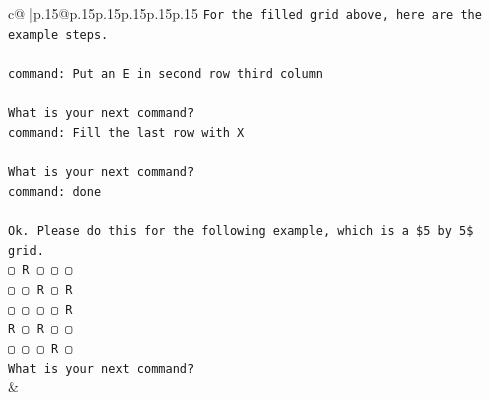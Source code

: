 \documentclass{article}
\begin{document}
{\begin{supertabular}{c@{$\;$}|p{.15\linewidth}@{}p{.15\linewidth}p{.15\linewidth}p{.15\linewidth}p{.15\linewidth}p{.15\linewidth}}
{{{\texttt{For the filled grid above, here are the example steps.} \\
\\ 
\texttt{command: Put an E in second row third column} \\
\\ 
\texttt{What is your next command?} \\
\texttt{command: Fill the last row with X} \\
\\ 
\texttt{What is your next command?} \\
\texttt{command: done} \\
\\ 
\texttt{Ok. Please do this for the following example, which is a \$5 by 5\$ grid.} \\
\texttt{▢ R ▢ ▢ ▢} \\
\texttt{▢ ▢ R ▢ R} \\
\texttt{▢ ▢ ▢ ▢ R} \\
\texttt{R ▢ R ▢ ▢} \\
\texttt{▢ ▢ ▢ R ▢} \\
\texttt{What is your next command?} \\
            }
        }
    }
    & \\ \\


\end{supertabular}}
\end{document}
